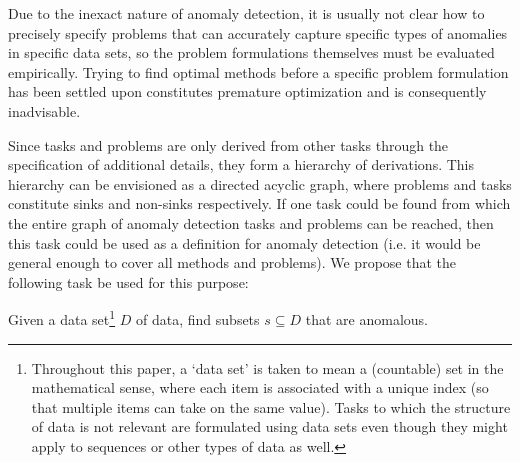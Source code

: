 Due to the inexact nature of anomaly detection, it is usually not clear how to precisely specify problems that can accurately capture specific types of anomalies in specific data sets, so the problem formulations themselves must be evaluated empirically. Trying to find optimal methods before a specific problem formulation has been settled upon constitutes premature optimization and is consequently inadvisable.

Since tasks and problems are only derived from other tasks through the specification of additional details, they form a hierarchy of derivations. This hierarchy can be envisioned as a directed acyclic graph, where problems and tasks constitute sinks and non-sinks respectively. If one task could be found from which the entire graph of anomaly detection tasks and problems can be reached, then this task could be used as a definition for anomaly detection (i.e. it would be general enough to cover all methods and problems). We propose that the following task be used for this purpose:

\begin{task}
  \label{task:anomaly_detection}
  Given a data set\footnote{Throughout this paper, a `data set' is taken to mean a (countable) set in the mathematical sense, where each item is associated with a unique index (so that multiple items can take on the same value). Tasks to which the structure of data is not relevant are formulated using data sets even though they might apply to sequences or other types of data as well.} $D$ of data, find subsets $s \subseteq D$ that are anomalous.
\end{task}

